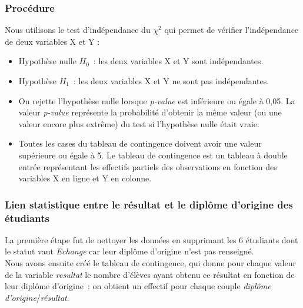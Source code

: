 \documentclass[a4paper,11pt]{report}
\begin{document}
\subsubsection{Procédure}

Nous utilisons le test d'indépendance du $\chi^2$ qui permet de vérifier l'indépendance de deux variables X et Y : 

\begin{itemize}
	\item Hypothèse nulle $H_{0}$~: les deux variables X et Y sont indépendantes.
	\item Hypothèse $H_{1}$~: les deux variables X et Y ne sont pas indépendantes.
	\item On rejette l'hypothèse nulle lorsque \textit{p-value} est inférieure ou égale à 0,05. La valeur \textit{p-value} représente la probabilité d'obtenir la même valeur (ou une valeur encore plus extrême) du test si l'hypothèse nulle était vraie.
	\item Toutes les cases du tableau de contingence doivent avoir une valeur supérieure ou égale à 5. Le tableau de contingence est un tableau à double entrée représentant les effectifs partiels des observations en fonction des variables X en ligne et Y en colonne.
\end{itemize}





\subsubsection{Lien statistique entre le résultat et le diplôme d'origine des étudiants}
La première étape fut de nettoyer les données en supprimant les 6 étudiants dont le statut vaut \textit{Echange} car leur diplôme d'origine n'est pas renseigné.\\
Nous avons ensuite créé le tableau de contingence, qui donne pour chaque valeur de la variable \textit{resultat} le nombre d'élèves ayant obtenu ce résultat en fonction de leur diplôme d'origine~: on obtient un effectif pour chaque couple \textit{diplôme d'origine}/\textit{résultat}.
\end{document}
